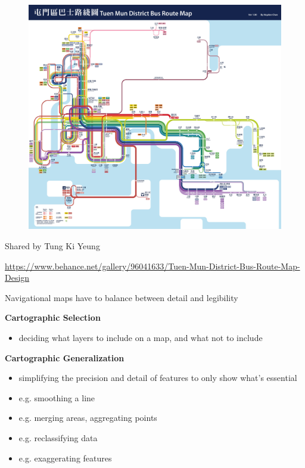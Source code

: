 \documentclass[aspectratio=169]{beamer}
\begin{document}
\begin{frame}
	
	\begin{figure}
		\centering
		\includegraphics[width=0.68\linewidth]{images/hong_kong_bus.jpg}
	\end{figure}
	
	\tiny Shared by Tung Ki Yeung
	
	\tiny \url{https://www.behance.net/gallery/96041633/Tuen-Mun-District-Bus-Route-Map-Design}
	
\end{frame}










\begin{frame}
	
	Navigational maps have to balance between detail and legibility
	
	\vspace{6mm}
	
	\textbf{Cartographic Selection}
	
	\begin{itemize}
		\item deciding what layers to include on a map, and what not to include
	\end{itemize}
	
	 \textbf{Cartographic Generalization}
	\begin{itemize}
		\item simplifying the precision and detail of features to only show what's essential
		\item e.g. smoothing a line
		\item e.g. merging areas, aggregating points
		\item e.g. reclassifying data
		\item e.g. exaggerating features
	\end{itemize}
	
\end{frame}
\end{document}
